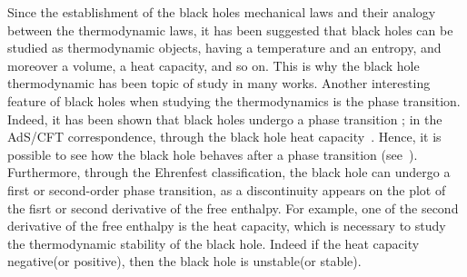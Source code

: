 \documentclass[10pt,letterpaper]{article}
\begin{document}

Since the establishment of the black holes mechanical laws and their analogy between the thermodynamic laws, it has been suggested that black holes can be studied as  thermodynamic objects, having a temperature and an entropy, and moreover a volume, a heat capacity, and so on\cite{bekenstein1975statistical,bekenstein1973extraction,bardeen1973four,hawking1975particle}. This is why the black hole thermodynamic has been topic of study in many works\cite{tharanath2013thermodynamics,gibbons1977cosmological,yi2011thermodynamic,ghaderi2016thermodynamics,shahjalal2019thermodynamics,Banerjee2011b,appels2016thermodynamics}. Another interesting feature of black holes when studying the thermodynamics is the phase transition. Indeed, it has been shown that black holes undergo a phase transition ; in the AdS/CFT correspondence, through the black hole heat capacity~\cite{tharanath2013thermodynamics}.  Hence, it is possible  to see how the black hole behaves after a phase transition (see~\cite{rodrigue2020thermodynamic,cai2009thermodynamics,Mahamat2018,rodrigue2018thermodynamics,tharanath2013thermodynamics,tharanath2014phase,li2020thermodynamic}). Furthermore, through the Ehrenfest classification, the black hole can undergo a  first or second-order phase transition, as a discontinuity appears on the plot of the fisrt or second derivative of the free enthalpy. For example, one of the second derivative of the free enthalpy is the heat capacity, which is necessary to study the thermodynamic stability of the black hole. Indeed if the heat capacity negative(or positive), then the black hole is unstable(or stable). 
\end{document}
